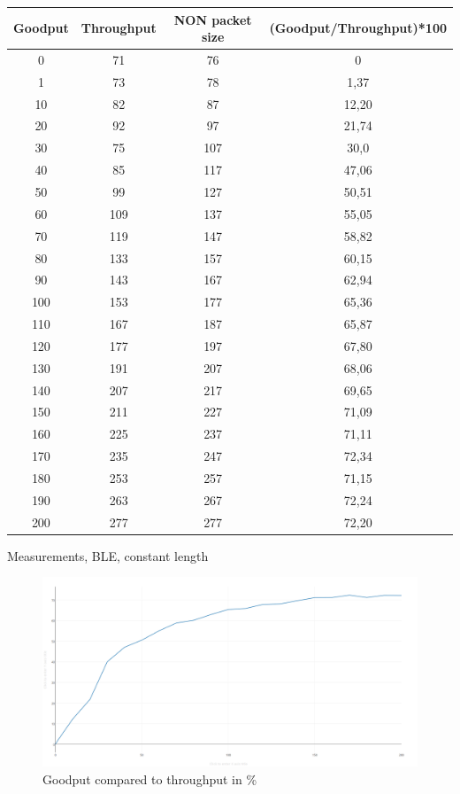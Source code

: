 \begin{center}
 \begin{tabular}{||c c c c||} 
 \hline
 Goodput & Throughput & NON packet size & (Goodput/Throughput)*100 \\ [0.5ex] 
 \hline\hline
 0 & 71 & 76 & 0 \\ 
 \hline
 1 & 73 & 78 & 1,37 \\
 \hline
 10 & 82 & 87 & 12,20 \\
 \hline
 20 & 92 & 97 & 21,74 \\
  \hline
 30 & 75 & 107 & 30,0 \\
  \hline
 40 & 85 & 117 & 47,06 \\
  \hline
 50 & 99 & 127 & 50,51 \\
  \hline
 60 & 109 & 137 & 55,05 \\
  \hline
 70 & 119 & 147 & 58,82 \\
  \hline
 80 & 133 & 157 & 60,15 \\
  \hline
 90 & 143 & 167 & 62,94 \\
 \hline
 100 & 153 & 177 & 65,36 \\
 \hline
 110 & 167 & 187 & 65,87 \\
 \hline
 120 & 177 & 197 & 67,80 \\
 \hline
 130 & 191 & 207 & 68,06 \\
 \hline
 140 & 207 & 217 & 69,65 \\
 \hline
 150 & 211 & 227 & 71,09 \\
 \hline
 160 & 225 & 237 & 71,11 \\
 \hline
 170 & 235 & 247 & 72,34 \\
 \hline
 180 & 253 & 257 & 71,15 \\
 \hline
 190 & 263 & 267 & 72,24 \\
 \hline
 200 & 277 & 277 & 72,20 \\ [1ex] 
 \hline
\end{tabular}
\caption{Measurements, BLE, constant length}
\label{table:1}
\end{center}



\begin{figure}[ht]
    \centering
    \includegraphics[scale=0.25]{graph1.png}    
    \caption{Goodput compared to throughput in \%}
    \label{fig:goodputThroughputGraph}
\end{figure}


